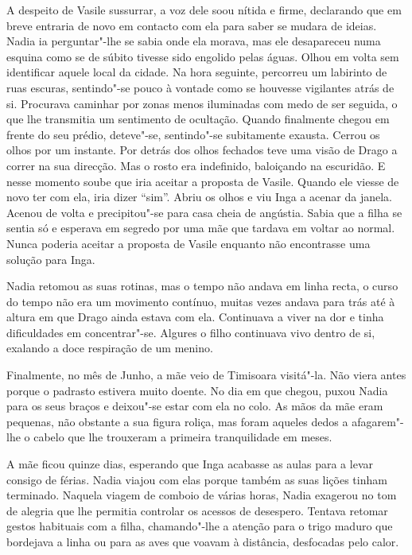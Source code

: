 A despeito de Vasile sussurrar, a voz dele soou nítida e
firme, declarando que em breve entraria de novo em contacto com ela
para saber se mudara de ideias. Nadia ia perguntar"-lhe se sabia onde ela
morava, mas ele desapareceu numa esquina como se de súbito tivesse
sido engolido pelas águas. Olhou em volta sem identificar aquele local
da cidade. Na hora seguinte, percorreu um labirinto de ruas escuras,
sentindo"-se pouco à vontade como se houvesse vigilantes atrás de si.
Procurava caminhar por zonas menos iluminadas com medo de ser seguida, o
que lhe transmitia um sentimento de ocultação. Quando finalmente
chegou em frente do seu prédio, deteve"-se, sentindo"-se subitamente exausta. Cerrou os olhos por um instante. Por detrás dos
olhos fechados teve uma visão de Drago a
correr na sua direcção. Mas o rosto era indefinido, baloiçando na
escuridão. E nesse momento soube que iria aceitar a proposta de Vasile.
Quando ele viesse de novo ter com ela, iria dizer ``sim''. Abriu os olhos
e viu Inga a acenar da janela. Acenou de volta e precipitou"-se para
casa cheia de angústia. Sabia que a filha se sentia só e esperava em
segredo por uma mãe que tardava em voltar ao normal. Nunca poderia
aceitar a proposta de Vasile enquanto não encontrasse uma solução para
Inga.

Nadia retomou as suas rotinas, mas o tempo não andava em linha recta, o
curso do tempo não era um movimento contínuo, muitas vezes andava para
trás até à altura em que Drago ainda estava com ela. Continuava a viver
na dor e tinha dificuldades em concentrar"-se. Algures o filho continuava
vivo dentro de si, exalando a doce respiração de um menino.

Finalmente, no mês de Junho, a mãe veio de Timisoara visitá"-la. Não
viera antes porque o padrasto estivera muito doente. No dia em que
chegou, puxou Nadia para os seus braços e deixou"-se estar com ela no
colo. As mãos da mãe eram pequenas, não obstante a sua figura roliça,
mas foram aqueles dedos a afagarem"-lhe o cabelo que lhe trouxeram a
primeira tranquilidade em meses.

A mãe ficou quinze dias, esperando que Inga acabasse as aulas para a
levar consigo de férias. Nadia viajou com elas porque também as suas
lições tinham terminado. Naquela viagem de comboio de várias horas,
Nadia exagerou no tom de alegria que lhe permitia controlar os acessos
de desespero. Tentava retomar gestos habituais
com a filha, chamando"-lhe a atenção para o trigo maduro que bordejava a
linha ou para as aves que voavam à distância, desfocadas pelo calor.

